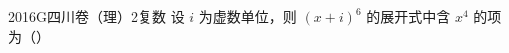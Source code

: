 
\begin{problem}{2016}{G}{四川卷（理）}{2}{复数}
设 $ i $ 为虚数单位，则 $ (x + i)^6 $ 的展开式中含 $ x^4 $ 的项为（\hspace{1cm}）
\begin{choices}
\end{choices}
\end{problem}

\begin{answer}

\end{answer}

\begin{solutions}

\end{solutions}